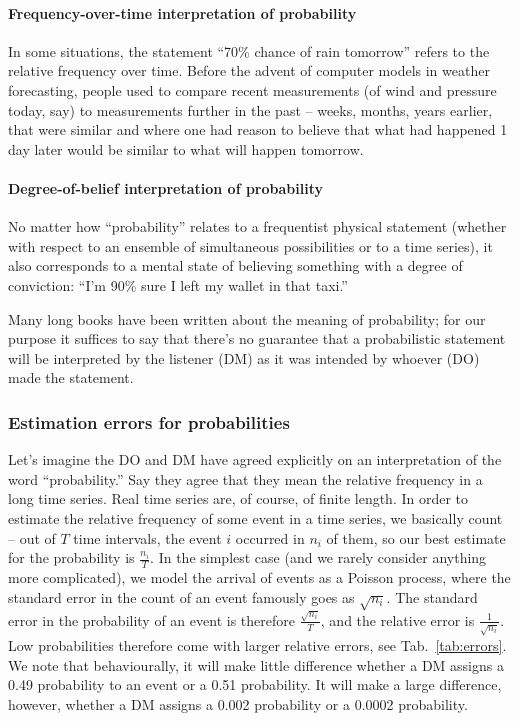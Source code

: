 \documentclass[a4paper, 12pt]{article}
\newcommand{\tref}[1]{Tab.~\ref{tab:#1}}
\begin{document}
\paragraph{Frequency-over-time interpretation of probability}
In some situations, the statement ``70\% chance of rain tomorrow'' refers to the relative frequency over time. Before the advent of computer models in weather forecasting, people used to compare recent measurements (of wind and pressure today, say) to measurements further in the past -- weeks, months, years earlier, that were similar and where one had reason to believe that what had happened 1 day later would be similar to what will happen tomorrow.

\paragraph{Degree-of-belief interpretation of probability}
No matter how ``probability'' relates to a frequentist physical statement (whether with respect to an ensemble of simultaneous possibilities or to a time series), it also corresponds to a mental state of believing something with a degree of conviction: ``I'm 90\% sure I left my wallet in that taxi.''

Many long books have been written about the meaning of probability; for our purpose it suffices to say that there's no guarantee that a probabilistic statement will be interpreted by the listener (DM) as it was intended by whoever (DO) made the statement.

\subsubsection*{Estimation errors for probabilities}
Let's imagine the DO and DM have agreed explicitly on an interpretation of the word ``probability.'' Say they agree that they mean the relative frequency in a long time series. Real time series are, of course, of finite length. In order to estimate the relative frequency of some event in a time series, we basically count -- out of $T$ time intervals, the event $i$ occurred in $n_i$ of them, so our best estimate for the probability is $\frac{n_i}{T}$. In the simplest case (and we rarely consider anything more complicated), we model the arrival of events as a Poisson process, where the standard error in the count of an event famously goes as $\sqrt{n_i}$. The standard error in the probability of an event is therefore $\frac{\sqrt{n_i}}{T}$, and the relative error is $\frac{1}{\sqrt{n_i}}$. Low probabilities therefore come with larger relative errors, see \tref{errors}. We note that behaviourally, it will make little difference whether a DM assigns a 0.49 probability to an event or a 0.51 probability. It will make a large difference, however, whether a DM assigns a 0.002 probability or a 0.0002 probability.
\end{document}
